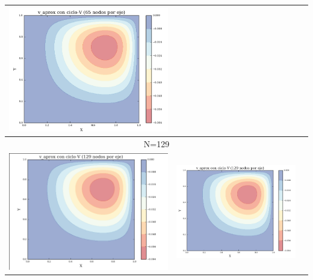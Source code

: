 \documentclass[letter,10pt]{article}
\begin{document}
\begin{table}[H]
\begin{tabular}[t]{|c|c|c|}
\includegraphics[scale=0.26]{img/v_cvRBGS65NFW} \\ \hline
\multicolumn{3}{|c|}{N=129} \\ \hline
\includegraphics[scale=0.38]{img/v_cvjacobi129NFW}&
\includegraphics[scale=0.38]{img/v_cvGS129NFW}&

\end{tabular}
\end{table}
\end{document}
